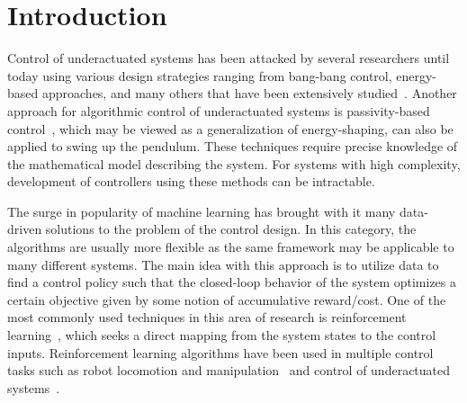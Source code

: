 \section{Introduction}
%
Control of underactuated systems has been attacked by several researchers until
today using various design strategies ranging from bang-bang control,
energy-based approaches, and many others that have been extensively
studied~\citep{mori1976control, park2009swing, mason2008time,
aastrom2000swinging}. Another approach for algorithmic control of underactuated
systems is passivity-based control~\citep{ortega2002stabilization,van2000l2},
which may be viewed as a generalization of energy-shaping, can also be
applied to swing up the pendulum. 
%
%
These techniques require precise knowledge of the mathematical model describing
the system. 
%
For systems with high complexity, development of controllers using these methods
can be intractable.

The surge in popularity of machine learning has brought with it many data-driven
solutions to the problem of the control design. In this category, the algorithms
are usually more flexible as the same framework may be applicable to many
different systems.
%
%
The main idea with this approach is to utilize data to find a control policy
such that the closed-loop behavior of the system optimizes a certain objective
given by some notion of accumulative reward/cost.
%
One of the most commonly used techniques in this area of research is
reinforcement learning~\citep{sutton2018reinforcement}, which seeks a direct
mapping from the system states to the control inputs.
%
Reinforcement learning algorithms have been used in multiple control tasks
such as robot locomotion and
manipulation~\citep{heess2017emergence,andrychowicz2020learning} and control of
underactuated systems~\citep{lillicrap2015continuous}. 

